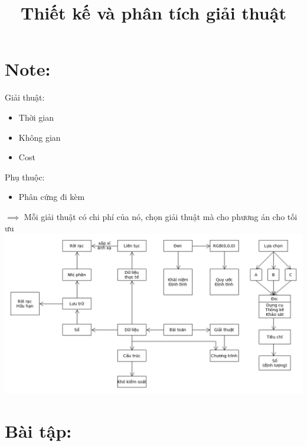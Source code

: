 \documentclass[]{article}
\title{Thiết kế và phân tích giải thuật}
\begin{document}
\maketitle{}
\section{Note:}
Giải thuật:
\begin{itemize}
\item Thời gian
\item Không gian
\item Cost
\end{itemize}
\par
Phụ thuộc:
\begin{itemize}
\item Phân cứng đi kèm
\end{itemize}
\par
$\implies$ Mỗi giải thuật có chi phí của nó, chọn giải thuật mà cho phương án cho tối ưu
\includegraphics{intro.png}
\section{Bài tập:}
\end{document}
